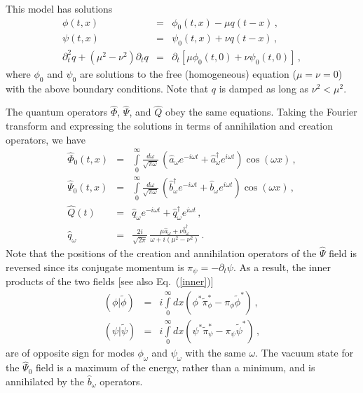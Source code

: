 \documentclass[aps,prd,showpacs,amssymb,nofootinbib,twocolumn]{revtex4}
\newcommand{\inner}[2]{\left(#1|#2\right)}
\newcommand{\nn}{\nonumber\\}
\newcommand{\bea}{\begin{eqnarray}}
\newcommand{\ea}{\end{eqnarray}}
\newcommand{\eea}{\end{eqnarray}}
\begin{document}
This model has solutions %
%
\bea
\label{eom-phi}
\phi(t,x)&=&\phi_0(t,x) - \mu  q(t-x)
\,, 
\\
\label{eom-psi}
\psi(t,x)&=&\psi_0(t,x) +\nu q(t-x) 
\,,
\\
\partial_t^2 q +(\mu^2-\nu^2)\partial_t q
&=& 
\partial_t[\mu\phi_0(t,0)+\nu\psi_0(t,0)]
\,,
\eea
%
where $\phi_0$ and $\psi_0$ are solutions to the free (homogeneous)
equation ($\mu=\nu=0$) with the above boundary conditions.
%
Note that $q$ is damped as long as $\nu^2<\mu^2$.

The quantum operators $\hat\Phi$, $\hat\Psi$, and $\hat Q$ obey the same 
equations.
%
Taking the Fourier transform and expressing the solutions in terms of
annihilation and creation operators, we have
%
\bea
\label{free-phi}
\hat\Phi_{0}(t,x)
&=&
\int\limits_0^\infty 
\frac{d\omega}{\sqrt{\pi\omega}}\,
\left(\hat a_\omega e^{-i\omega t}
+\hat a^\dagger_\omega e^{i\omega t}\right)
\cos(\omega x)
\,,
\\
\label{free-psi}
\hat\Psi_{0}(t,x)
&=&
\int\limits_0^\infty 
\frac{d\omega}{\sqrt{\pi\omega}}\,
\left(
\hat b^\dagger_\omega e^{-i\omega t}
+\hat b_\omega e^{i\omega t}\right)
\cos(\omega x)
\,,
\\
\hat Q(t)
&=& 
\hat q_\omega e^{-i\omega t} +\hat q^\dagger_\omega e^{i\omega t}
\,,
\\
\hat q_\omega 
&=& 
\frac{2i}{\sqrt{2\pi}}\,
\frac{\mu\hat a_\omega+\nu\hat b_\omega^\dagger}{\omega+i(\mu^2-\nu^2)}
\,.
\eea
%
Note that the positions of the creation and annihilation operators of the 
$\hat\Psi$ field is reversed since its conjugate momentum is 
$\pi_\psi=-\partial_t\psi$.
%
As a result, the inner products of the two fields 
[see also Eq.~(\ref{inner})]
%
\bea
\inner{\phi}{\tilde\phi}
&=&
i\int\limits_0^\infty dx
\left(\phi^*\tilde\pi_\phi^*-\pi_\phi\tilde\phi^*
\right) 
\,,
\nn
\inner{\psi}{\tilde\psi}
&=&
i\int\limits_0^\infty dx
\left(\psi^*\tilde\pi_\psi^*-\pi_\psi\tilde\psi^*
\right) 
\,,
\ea
%
are of opposite sign for modes $\phi_\omega$ and $\psi_\omega$ with the 
same $\omega$.
%
The vacuum state for the $\hat\Psi_0$ field is a maximum of the energy, 
rather than a minimum, and is annihilated by the $\hat b_\omega$ operators.
\end{document}

